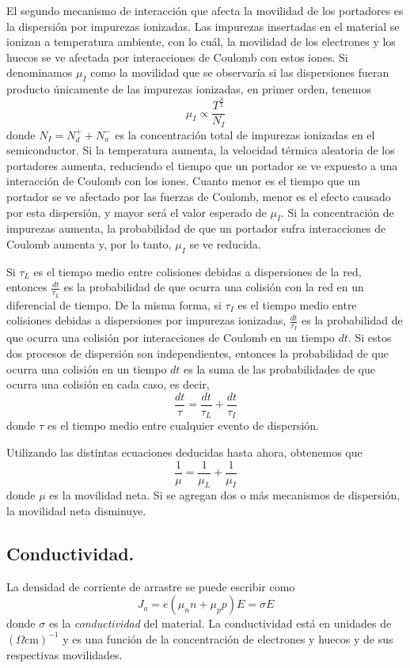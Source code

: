 \documentclass[12pt,a4paper]{article}
\begin{document}
El segundo mecanismo de interacción que afecta la movilidad de los portadores es la dispersión por impurezas ionizadas. Las impurezas insertadas en el material se ionizan a temperatura ambiente, con lo cuál, la movilidad de los electrones y los huecos se ve afectada por interacciones de Coulomb con estos iones. Si denominamos $\mu _{I}$ como la movilidad que se observaría si las dispersiones fueran producto únicamente de las impurezas ionizadas, en primer orden, tenemos
\[ \mu _{I} \propto \frac{T^{\frac{3}{2}}}{N_{I}} \]
donde $N_{I}=N_{d}^{+}+N_{a}^{-}$ es la concentración total de impurezas ionizadas en el semiconductor. Si la temperatura aumenta, la velocidad térmica aleatoria de los portadores aumenta, reduciendo el tiempo que un portador se ve expuesto a una interacción de Coulomb con los iones. Cuanto menor es el tiempo que un portador se ve afectado por las fuerzas de Coulomb, menor es el efecto causado por esta dispersión, y mayor será el valor esperado de $\mu _{I}$. Si la concentración de impurezas aumenta, la probabilidad de que un portador sufra interacciones de Coulomb aumenta y, por lo tanto, $\mu _{I}$ se ve reducida.

Si $\tau _{L}$ es el tiempo medio entre colisiones debidas a dispersiones de la red, entonces $\frac{dt}{\tau _{L}}$ es la probabilidad de que ocurra una colisión con la red en un diferencial de tiempo. De la misma forma, si $\tau _{I}$ es el tiempo medio entre colisiones debidas a dispersiones por impurezas ionizadas, $\frac{dt}{\tau _{I}}$ es la probabilidad de que ocurra una colisión por interacciones de Coulomb en un tiempo $dt$. Si estos dos procesos de dispersión son independientes, entonces la probabilidad de que ocurra una colisión en un tiempo $dt$ es la suma de las probabilidades de que ocurra una colisión en cada caso, es decir,
\[ \frac{dt}{\tau} = \frac{dt}{\tau _{L}} + \frac{dt}{\tau _{I}} \]
donde $\tau$ es el tiempo medio entre cualquier evento de dispersión.

Utilizando las distintas ecuaciones deducidas hasta ahora, obtenemos que
\[ \frac{1}{\mu} = \frac{1}{\mu _{L}} + \frac{1}{\mu _{I}} \]
donde $\mu$ es la movilidad neta. Si se agregan dos o más mecanismos de dispersión, la movilidad neta disminuye.

\subsection{Conductividad.}

La densidad de corriente de arrastre se puede escribir como
\[ J_{a}=e(\mu _{n}n+\mu _{p} p)E=\sigma E \]
donde $\sigma$ es la \emph{conductividad} del material. La conductividad está en unidades de $(\Omega \textrm{cm})^{-1}$ y es una función de la concentración de electrones y huecos y de sus respectivas movilidades.
\end{document}
